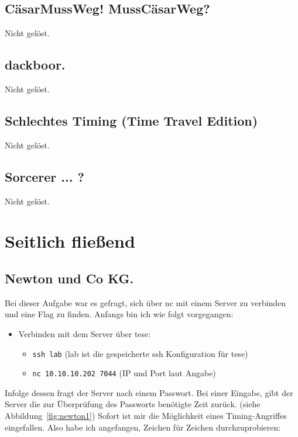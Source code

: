 \documentclass[12pt, a4paper, titlepage, oneside]{scrartcl}
\begin{document}
	\subsection{C\"asarMussWeg! MussC\"asarWeg?}
	Nicht gelöst.

	\subsection{dackboor.}
	Nicht gelöst.

	\subsection{Schlechtes Timing (Time Travel Edition)}
	Nicht gelöst.

	\subsection{Sorcerer ... ?}
	Nicht gelöst.

	\newpage

	\section{Seitlich fließend}

	\subsection{Newton und Co KG.}
	Bei dieser Aufgabe war es gefragt, sich über nc mit einem Server zu verbinden und eine Flag zu finden.
	Anfangs bin ich wie folgt vorgegangen:
	\begin{itemize}
		\item Verbinden mit dem Server über tese: 
		\begin{itemize}
			\item \lstinline{ssh lab} (lab ist die gespeicherte ssh Konfiguration für tese)
			\item \lstinline{nc 10.10.10.202 7044} (IP und Port laut Angabe)
		\end{itemize}
	\end{itemize}
	Infolge dessen fragt der Server nach einem Passwort. Bei einer Eingabe, gibt der Server die zur Überprüfung des Passworts benötigte Zeit zurück. (siehe Abbildung~\ref*{fig:newton1})
	Sofort ist mir die Möglichkeit eines Timing-Angriffes eingefallen. Also habe ich angefangen, Zeichen für Zeichen durchzuprobieren:
	
\end{document}

